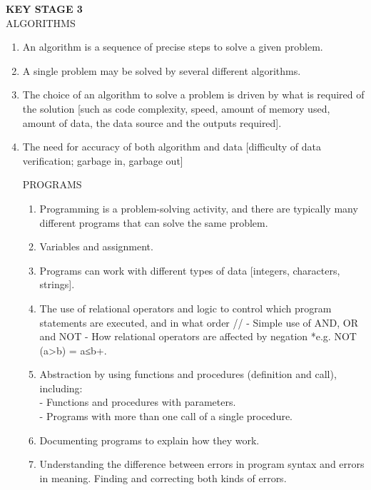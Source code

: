 \textbf{KEY STAGE 3}\\
ALGORITHMS
\begin{enumerate}
\item An algorithm is a sequence of precise steps to solve a given problem.
\item A single problem may be solved by several different algorithms.
\item The choice of an algorithm to solve a problem is driven by what is required of the
solution [such as code complexity, speed, amount of memory used, amount of data,
the data source and the outputs required].
\item The need for accuracy of both algorithm and data [difficulty of data verification;
garbage in, garbage out]

PROGRAMS
\begin{enumerate}
\item Programming is a problem-solving activity, and there are typically many different
programs that can solve the same problem.
\item Variables and assignment.
\item Programs can work with different types of data [integers, characters, strings].
\item The use of relational operators and logic to control which program statements are
executed, and in what order //
- Simple use of AND, OR and NOT
- How relational operators are affected by negation *e.g. NOT (a>b) = a≤b+.
\item Abstraction by using functions and procedures (definition and call), including:\\
- Functions and procedures with parameters.\\
- Programs with more than one call of a single procedure.
\item Documenting programs to explain how they work.
\item Understanding the difference between errors in program syntax and errors in
meaning. Finding and correcting both kinds of errors.
\end{enumerate}


\end{enumerate}
